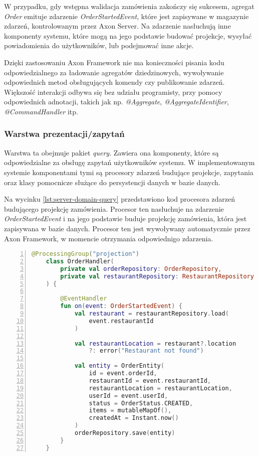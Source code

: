 W przypadku, gdy wstępna walidacja zamówienia zakończy się sukcesem, agregat \textit{Order} emituje zdarzenie \textit{OrderStartedEvent}, które jest zapisywane w magazynie zdarzeń, kontrolowanym przez Axon Server. Na zdarzenie nasłuchują inne komponenty systemu, które mogą na jego podstawie budować projekcje, wysyłać powiadomienia do użytkowników, lub podejmować inne akcje.

Dzięki zastosowaniu Axon Framework nie ma konieczności pisania kodu odpowiedzialnego za ładowanie agregatów dziedzinowych, wywoływanie odpowiednich metod obsługujących komendy czy publikowanie zdarzeń. Większość interakcji odbywa się bez udziału programisty, przy pomocy odpowiednich adnotacji, takich jak np. \textit{@Aggregate}, \textit{@AggregateIdentifier}, \textit{@CommandHandler} itp.

\subsubsection{Warstwa prezentacji/zapytań}

Warstwa ta obejmuje pakiet \textit{query}. Zawiera ona komponenty, które są odpowiedzialne za obsługę zapytań użytkowników systemu. W implementowanym systemie komponentami tymi są procesory zdarzeń budujące projekcje, zapytania oraz klasy pomocnicze służące do persystencji danych w bazie danych.

Na wycinku \ref{lst:server-domain-query} przedstawiono kod procesora zdarzeń budującego projekcję zamówienia. Procesor ten nasłuchuje na zdarzenie \textit{OrderStartedEvent} i na jego podstawie buduje projekcję zamówienia, która jest zapisywana w bazie danych. Procesor ten jest wywoływany automatycznie przez Axon Framework, w momencie otrzymania odpowiednigo zdarzenia.

\begin{lstlisting}[caption={Kod procesora zdarzeń budującego projekcję zamówienia},label={lst:server-domain-query},captionpos=b,language=Kotlin,numbers=left,showstringspaces=false]
    @ProcessingGroup("projection")
    class OrderHandler(
        private val orderRepository: OrderRepository,
        private val restaurantRepository: RestaurantRepository
    ) {
    
        @EventHandler
        fun on(event: OrderStartedEvent) {
            val restaurant = restaurantRepository.load(
                event.restaurantId
            )
    
            val restaurantLocation = restaurant?.location 
                ?: error("Restaurant not found")
    
            val entity = OrderEntity(
                id = event.orderId,
                restaurantId = event.restaurantId,
                restaurantLocation = restaurantLocation,
                userId = event.userId,
                status = OrderStatus.CREATED,
                items = mutableMapOf(),
                createdAt = Instant.now()
            )
            orderRepository.save(entity)
        }
    }
\end{lstlisting}

